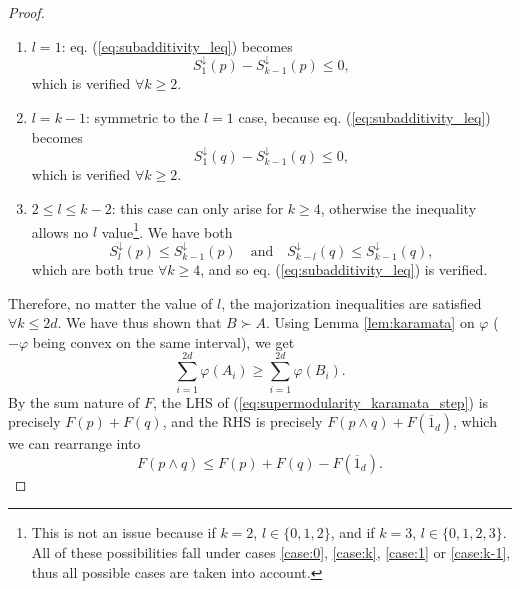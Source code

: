 \begin{proof}
\begin{enumerate}[resume]
        \item \underline{$l = 1$}: eq. (\ref{eq:subadditivity_leq}) becomes \label{case:1}
        \begin{equation}
            S^\downarrow_1(p) - S^\downarrow_{k-1}(p) \leq 0,
        \end{equation}
        which is verified $\forall k \geq 2$.
        \item \underline{$l = k - 1$}: symmetric to the $l = 1$ case, because eq. (\ref{eq:subadditivity_leq}) becomes \label{case:k-1}
        \begin{equation}
            S^\downarrow_1(q) - S^\downarrow_{k-1}(q) \leq 0,
        \end{equation}
        which is verified $\forall k \geq 2$.
        \item \underline{$2 \leq l \leq k-2$}: this case can only arise for $k \geq 4$, otherwise the inequality allows no $l$ value\footnote{This is not an issue because if $k=2$, $l \in \{0, 1, 2\}$, and if $k = 3$, $l \in \{0, 1, 2, 3\}$. All of these possibilities fall under cases \ref{case:0}, \ref{case:k}, \ref{case:1} or \ref{case:k-1}, thus all possible cases are taken into account.}. We have both \label{case:rest}
        \begin{equation}
            S^\downarrow_l (p) \leq S^\downarrow_{k-1}(p) \quad \text{and} \quad S^\downarrow_{k-l} (q) \leq S^\downarrow_{k-1}(q),
        \end{equation}
        which are both true $\forall k \geq 4$, and so eq. (\ref{eq:subadditivity_leq}) is verified. %
    \end{enumerate}
    Therefore, no matter the value of $l$, the majorization inequalities are satisfied $\forall k \leq 2d$. We have thus shown that $B \succ A$.
    Using Lemma \ref{lem:karamata} on $\varphi$ ($-\varphi$ being convex on the same interval), we get
    \begin{equation} \label{eq:subadditivity_karamata_step}
        \sum_{i=1}^{2d} \varphi(A_i) \geq \sum_{i=1}^{2d} \varphi(B_i).
    \end{equation}
    By the sum nature of $F$, the LHS of (\ref{eq:supermodularity_karamata_step}) is precisely $F(p) + F(q)$, and the RHS is precisely $F(p \wedge q) + F(\overline{1}_d)$, which we can rearrange into
    \begin{equation}
        F(p \wedge q) \leq F(p) + F(q) - F(\overline{1}_d).
    \end{equation}
\end{proof}

